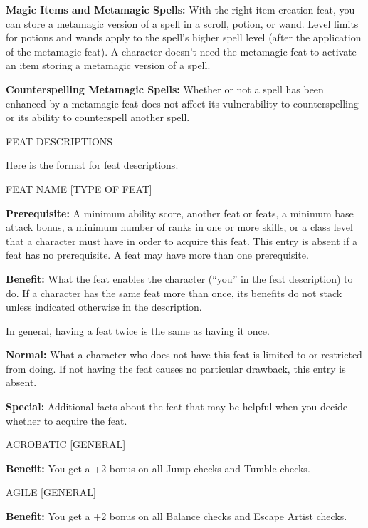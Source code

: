 \documentclass{article}
\begin{document}
\vspace{12pt}
\textbf{Magic Items and Metamagic Spells:} With the right item creation feat, you 
can store a metamagic version of a spell in a scroll, potion, or wand. Level limits 
for potions and wands apply to the spell's higher spell level (after the application 
of the metamagic feat). A character doesn't need the metamagic feat to activate 
an item storing a metamagic version of a spell.

\textbf{Counterspelling Metamagic Spells:} Whether or not a spell has been enhanced 
by a metamagic feat does not affect its vulnerability to counterspelling or its 
ability to counterspell another spell.

\vspace{12pt}
{\LARGE{}FEAT DESCRIPTIONS}

Here is the format for feat descriptions.

\vspace{12pt}
FEAT NAME [TYPE OF FEAT]

\textbf{Prerequisite:} A minimum ability score, another feat or feats, a minimum 
base attack bonus, a minimum number of ranks in one or more skills, or a class 
level that a character must have in order to acquire this feat. This entry is absent 
if a feat has no prerequisite. A feat may have more than one prerequisite.

\textbf{Benefit:} What the feat enables the character (``you'' in the feat description) 
to do. If a character has the same feat more than once, its benefits do not stack 
unless indicated otherwise in the description.

In general, having a feat twice is the same as having it once.

\textbf{Normal:} What a character who does not have this feat is limited to or 
restricted from doing. If not having the feat causes no particular drawback, this 
entry is absent.

\textbf{Special: }Additional facts about the feat that may be helpful when you 
decide whether to acquire the feat.

\vspace{24pt}
ACROBATIC [GENERAL]

\textbf{Benefit:} You get a +2 bonus on all Jump checks and Tumble checks.

\vspace{12pt}
AGILE [GENERAL]

\textbf{Benefit:} You get a +2 bonus on all Balance checks and Escape Artist checks.
\end{document}
